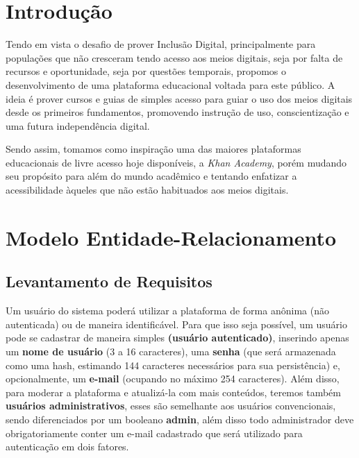 \chapter{Introdução}

Tendo em vista o desafio de prover Inclusão Digital, principalmente para
populações que não cresceram tendo acesso aos meios digitais, seja por falta de
recursos e oportunidade, seja por questões temporais, propomos o
desenvolvimento de uma plataforma educacional voltada para este público. A
ideia é prover cursos e guias de simples acesso para guiar o uso dos meios
digitais desde os primeiros fundamentos, promovendo instrução de uso,
conscientização e uma futura independência digital.

Sendo assim, tomamos como inspiração uma das maiores plataformas educacionais
de livre acesso hoje disponíveis, a \textit{Khan Academy}, porém mudando seu
propósito para além do mundo acadêmico e tentando enfatizar a acessibilidade
àqueles que não estão habituados aos meios digitais.

\chapter{Modelo Entidade-Relacionamento}


\section{Levantamento de Requisitos}


Um usuário do sistema poderá utilizar a plataforma de forma anônima (não
autenticada) ou de maneira identificável. Para que isso seja possível, um
usuário pode se cadastrar de maneira simples \textbf{(usuário autenticado)},
inserindo apenas um \textbf{nome de usuário} (3 a 16 caracteres), uma
\textbf{senha} (que será armazenada como uma hash, estimando 144 caracteres
necessários para sua persistência) e, opcionalmente, um \textbf{e-mail}
(ocupando no máximo 254 caracteres). Além disso, para moderar a plataforma e
atualizá-la com mais conteúdos, teremos também \textbf{usuários
  administrativos}, esses são semelhante aos usuários convencionais, sendo
diferenciados por um booleano \textbf{admin}, além disso todo administrador
deve obrigatoriamente conter um e-mail cadastrado que será utilizado para
autenticação em dois fatores.

